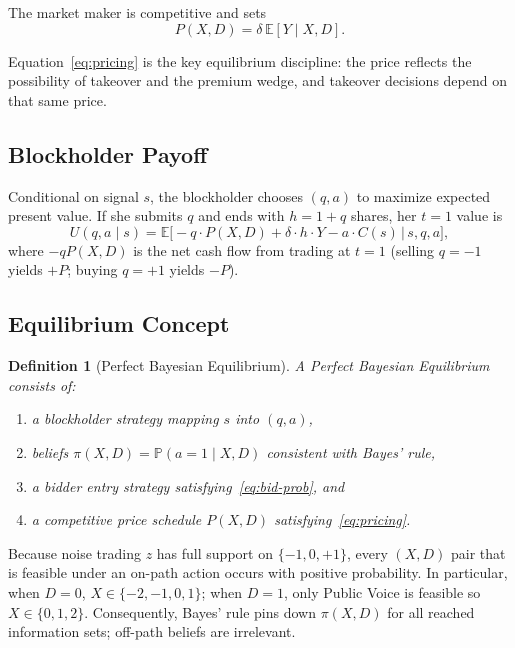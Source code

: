 \documentclass[11pt]{article}
\newtheorem{definition}{Definition}
\newcommand{\E}{\mathbb{E}}
\newcommand{\PP}{\mathbb{P}}
\newcommand{\1}{\mathbf{1}}
\begin{document}
The market maker is competitive and sets
\begin{equation}
P(X,D) = \delta \, \E[Y \mid X, D].
\label{eq:pricing}
\end{equation}

Equation~\eqref{eq:pricing} is the key equilibrium discipline: the price reflects the possibility of takeover and the premium wedge, and takeover decisions depend on that same price.

\subsection{Blockholder Payoff}

Conditional on signal $s$, the blockholder chooses $(q, a)$ to maximize expected present value. If she submits $q$ and ends with $h = 1 + q$ shares, her $t = 1$ value is
\[
U(q, a \mid s) = \E\Big[-q \cdot P(X,D) + \delta \cdot h \cdot Y - a \cdot C(s) \,\Big|\, s, q, a\Big],
\]
where $-qP(X,D)$ is the net cash flow from trading at $t = 1$ (selling $q = -1$ yields $+P$; buying $q = +1$ yields $-P$).

\subsection{Equilibrium Concept}

\begin{definition}[Perfect Bayesian Equilibrium]
A \emph{Perfect Bayesian Equilibrium} consists of:
\begin{enumerate}[label=(\roman{enumi})]
\item a blockholder strategy mapping $s$ into $(q, a)$,
\item beliefs $\pi(X,D) = \PP(a = 1 \mid X, D)$ consistent with Bayes' rule,
\item a bidder entry strategy satisfying~\eqref{eq:bid-prob}, and
\item a competitive price schedule $P(X,D)$ satisfying~\eqref{eq:pricing}.
\end{enumerate}
\end{definition}

Because noise trading $z$ has full support on $\{-1,0,+1\}$, every $(X,D)$ pair that is feasible under an on-path action occurs with positive probability. In particular, when $D=0$, $X\in\{-2,-1,0,1\}$; when $D=1$, only Public Voice is feasible so $X\in\{0,1,2\}$. Consequently, Bayes' rule pins down $\pi(X,D)$ for all reached information sets; off-path beliefs are irrelevant.
\end{document}
